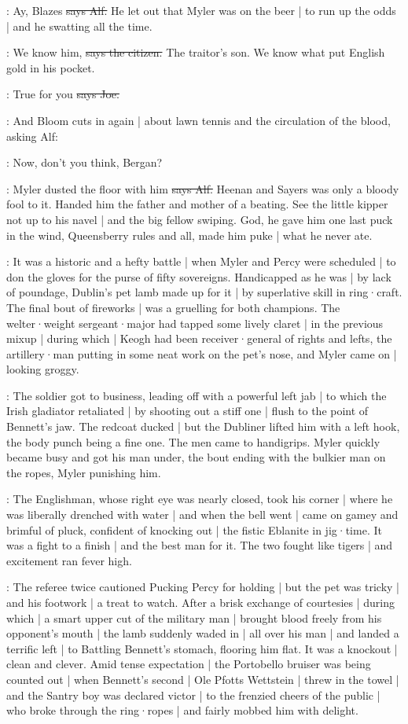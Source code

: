 \bergan:
Ay,
Blazes
\sout{says Alf.}
He let out that Myler was on the beer |
to run up the odds |
and he swatting all the time.

\citizen:
We know him,
\sout{says the citizen.}
The traitor's son.
We know what put English gold in his pocket.

\joe:
True for you
\sout{says Joe.}

\Nq:
And Bloom cuts in again |
about lawn tennis and the circulation of the blood,
asking Alf:

\Bloom:
Now,
don't you think,
Bergan?

\bergan:
Myler dusted the floor with him
\sout{says Alf.}
Heenan and Sayers was only a bloody fool to it.
Handed him the father and mother of a beating.
See the little kipper not up to his navel |
and the big fellow swiping.
God,
he gave him one last puck in the wind,
Queensberry rules and all,
made him puke |
what he never ate.

:
It was a historic and a hefty battle
 |
when Myler and Percy were scheduled |
to don the gloves for the purse of fifty sovereigns.
Handicapped as he was |
by lack of poundage,
Dublin's pet lamb made up for it |
by superlative skill in ring·craft.
The final bout of fireworks |
was a gruelling for both champions.
The welter·weight sergeant·major had tapped some lively claret |
in the previous mixup |
during which |
Keogh had been receiver·general of rights and lefts,
the artillery·man putting in some neat work on the pet's nose,
and Myler came on |
looking groggy.

:
The soldier got to business,
leading off with a powerful left jab |
to which the Irish gladiator retaliated |
by shooting out a stiff one |
flush to the point of Bennett's jaw.
The redcoat ducked |
but the Dubliner lifted him with a left hook,
the body punch being a fine one.
The men came to handigrips.
Myler quickly became busy and got his man under,
the bout ending with the bulkier man on the ropes,
Myler punishing him.

:
The Englishman,
whose right eye was nearly closed,
took his corner |
where he was liberally drenched with water |
and when the bell went |
came on gamey and brimful of pluck,
confident of knocking out |
the fistic Eblanite in jig·time.
It was a fight to a finish |
and the best man for it.
The two fought like tigers |
and excitement ran fever high.

:
The referee twice cautioned Pucking Percy for holding |
but the pet was tricky |
and his footwork |
a treat to watch.
After a brisk exchange of courtesies |
during which |
a smart upper cut of the military man
 |
brought blood freely from his opponent's mouth |
the lamb suddenly waded in |
all over his man |
and landed a terrific left |
to Battling Bennett's stomach,
flooring him flat.
It was a knockout |
clean and clever.
Amid tense expectation |
the Portobello bruiser was being counted out |
when Bennett's second |
Ole Pfotts Wettstein |
threw in the towel |
and the Santry boy was declared victor |
to the frenzied cheers of the public |
who broke through the ring·ropes |
and fairly mobbed him with delight.


